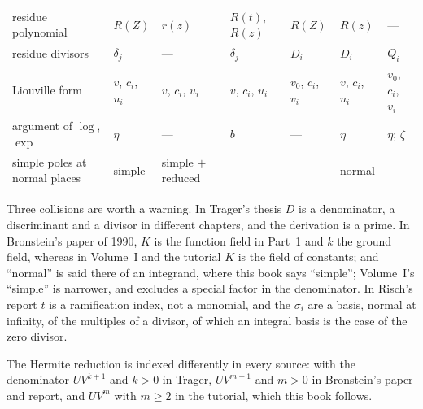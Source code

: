 \begin{center}
\begin{longtable}{@{}>{\raggedright}p{.19\linewidth}llllll@{}}
residue polynomial & $R(Z)$ & $r(z)$ & $R(t)$, $R(z)$ & $R(Z)$ & $R(z)$ & --- \\
residue divisors & $\delta_j$ & --- & $\delta_j$ & $D_i$ & $D_i$ & $Q_i$ \\
Liouville form & $v$, $c_i$, $u_i$ & $v$, $c_i$, $u_i$ & $v$, $c_i$, $u_i$ & $v_0$, $c_i$, $v_i$ & $v$, $c_i$, $u_i$ & $v_0$, $c_i$, $v_i$ \\
argument of $\log$, $\exp$ & $\eta$ & --- & $b$ & --- & $\eta$ & $\eta$; $\zeta$ \\
simple poles at normal places & simple & simple $+$ reduced & --- & --- & normal & --- \\
\bottomrule
\end{longtable}
\end{center}

Three collisions are worth a warning. In Trager's thesis $D$ is a
denominator, a discriminant and a divisor in different chapters, and the
derivation is a prime. In Bronstein's paper of 1990, $K$ is the function
field in Part~1 and $k$ the ground field, whereas in Volume~I and the
tutorial $K$ is the field of constants; and ``normal'' is said there of an
integrand, where this book says ``simple''; Volume~I's ``simple'' is
narrower, and excludes a special factor in the denominator. In Risch's report
$t$ is a ramification index, not a monomial, and the $\sigma_i$ are a
basis, normal at infinity, of the multiples of a divisor, of which an
integral basis is the case of the zero divisor.

The Hermite reduction is indexed differently in every source: with the
denominator $U V^{k+1}$ and $k > 0$ in Trager, $U V^{m+1}$ and $m > 0$ in
Bronstein's paper and report, and $U V^m$ with $m \ge 2$ in the tutorial,
which this book follows.
